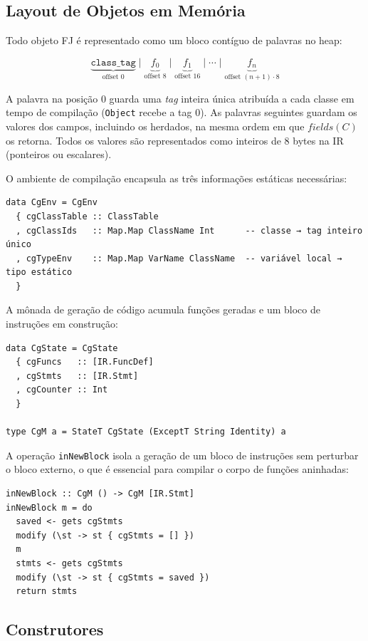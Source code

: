 \subsection{Layout de Objetos em Memória}

Todo objeto FJ é representado como um bloco contíguo de palavras no heap:

\[
  \underbrace{\mathtt{class\_tag}}_{\text{offset } 0}
  \mid
  \underbrace{f_0}_{\text{offset } 8}
  \mid
  \underbrace{f_1}_{\text{offset } 16}
  \mid \cdots \mid
  \underbrace{f_n}_{\text{offset } (n{+}1) \cdot 8}
\]

A palavra na posição 0 guarda uma \emph{tag} inteira única atribuída a
cada classe em tempo de compilação (\texttt{Object} recebe a tag 0).
As palavras seguintes guardam os valores dos campos, incluindo os
herdados, na mesma ordem em que \(\mathit{fields}(C)\) os retorna.
Todos os valores são representados como inteiros de 8 bytes na IR
(ponteiros ou escalares).

O ambiente de compilação encapsula as três informações estáticas
necessárias:

\begin{verbatim}
data CgEnv = CgEnv
  { cgClassTable :: ClassTable
  , cgClassIds   :: Map.Map ClassName Int      -- classe → tag inteiro único
  , cgTypeEnv    :: Map.Map VarName ClassName  -- variável local → tipo estático
  }
\end{verbatim}

A mônada de geração de código acumula funções geradas e um bloco de
instruções em construção:

\begin{verbatim}
data CgState = CgState
  { cgFuncs   :: [IR.FuncDef]
  , cgStmts   :: [IR.Stmt]
  , cgCounter :: Int
  }

type CgM a = StateT CgState (ExceptT String Identity) a
\end{verbatim}

A operação \texttt{inNewBlock} isola a geração de um bloco de
instruções sem perturbar o bloco externo, o que é essencial para
compilar o corpo de funções aninhadas:

\begin{verbatim}
inNewBlock :: CgM () -> CgM [IR.Stmt]
inNewBlock m = do
  saved <- gets cgStmts
  modify (\st -> st { cgStmts = [] })
  m
  stmts <- gets cgStmts
  modify (\st -> st { cgStmts = saved })
  return stmts
\end{verbatim}

\subsection{Construtores}

